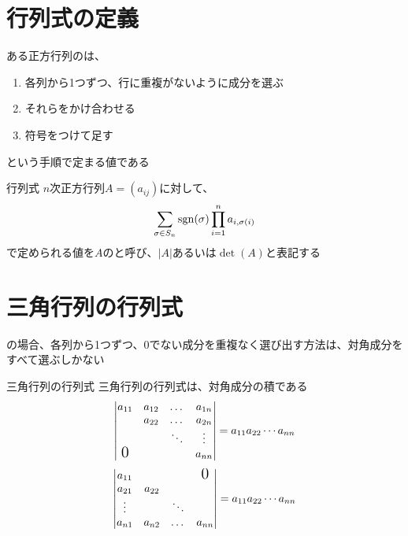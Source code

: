 \documentclass[../../../topic_linear-algebra]{subfiles}
\begin{document}
\sectionline
\section{行列式の定義}

ある正方行列のは、
\begin{enumerate}
  \item 各列から1つずつ、行に重複がないように成分を選ぶ
  \item それらをかけ合わせる
  \item 符号をつけて足す
\end{enumerate}
という手順で定まる値である

\begin{definition}{行列式}
  $n$次正方行列$A = (a_{ij})$に対して、
  \begin{equation*}
    \sum_{\sigma \in S_n} \operatorname{sgn}(\sigma) \prod_{i=1}^n a_{i,\sigma(i)}
  \end{equation*}
  で定められる値を$A$のと呼び、$|A|$あるいは$\det(A)$と表記する
\end{definition}

\sectionline
\section{三角行列の行列式}

の場合、各列から1つずつ、0でない成分を重複なく選び出す方法は、対角成分をすべて選ぶしかない

\begin{theorem}{三角行列の行列式}
  三角行列の行列式は、対角成分の積である
  \begin{equation*}
    \left|\begin{matrix}
      a_{11}           & a_{12} & \dots  & a_{1n} \\
                       & a_{22} & \dots  & a_{2n} \\
                       &        & \ddots & \vdots \\
      \text{\Large{0}} &        &        & a_{nn}
    \end{matrix}\right| = a_{11} a_{22} \cdots a_{nn}
  \end{equation*}
  \begin{equation*}
    \left|\begin{matrix}
      a_{11} &        &        & \text{\Large{0}} \\
      a_{21} & a_{22}                             \\
      \vdots &        & \ddots                    \\
      a_{n1} & a_{n2} & \dots  & a_{nn}
    \end{matrix}\right| = a_{11} a_{22} \cdots a_{nn}
  \end{equation*}
\end{theorem}
\end{document}
